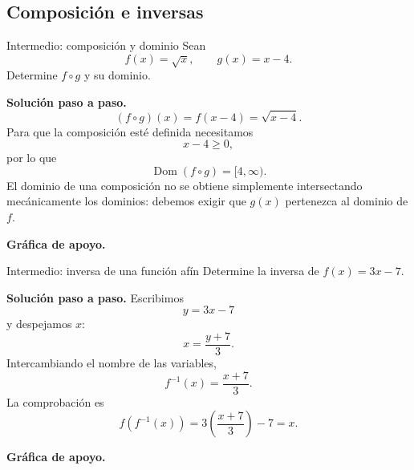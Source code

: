 \documentclass[aspectratio=169,10pt]{beamer}
\newcommand{\Dom}{\operatorname{Dom}}
\begin{document}
\subsection{Composición e inversas}

\begin{frame}{Intermedio: composición y dominio}
Sean
\[
f(x)=\sqrt{x},\qquad g(x)=x-4.
\]
Determine $f\circ g$ y su dominio.

\textbf{Solución paso a paso.}
\[
(f\circ g)(x)=f(x-4)=\sqrt{x-4}.
\]
Para que la composición esté definida necesitamos
\[
x-4\ge0,
\]
por lo que
\[
\boxed{\Dom(f\circ g)=[4,\infty)}.
\]
El dominio de una composición no se obtiene simplemente intersectando mecánicamente los dominios: debemos exigir que $g(x)$ pertenezca al dominio de $f$.


\textbf{Gráfica de apoyo.}\medskip
\begin{center}
\end{center}

\end{frame}

\begin{frame}{Intermedio: inversa de una función afín}
Determine la inversa de $f(x)=3x-7$.

\textbf{Solución paso a paso.} Escribimos
\[
y=3x-7
\]
y despejamos $x$:
\[
x=\frac{y+7}{3}.
\]
Intercambiando el nombre de las variables,
\[
\boxed{f^{-1}(x)=\frac{x+7}{3}}.
\]
La comprobación es
\[
f(f^{-1}(x))=3\left(\frac{x+7}{3}\right)-7=x.
\]


\textbf{Gráfica de apoyo.}\medskip
\begin{center}
\end{center}

\end{frame}
\end{document}
